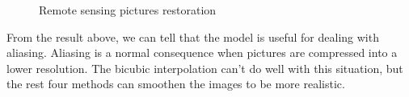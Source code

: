 \documentclass{article}
\begin{document}
\begin{figure}[H]
      \caption{Remote sensing pictures restoration}
  \end{figure}
  From the result above, we can tell that the model is useful for dealing with aliasing.
  Aliasing is a normal consequence when pictures are compressed into a lower resolution.
  The bicubic interpolation can't do well with this situation, 
  but the rest four methods can smoothen the images to be more realistic.
  
\end{document}
